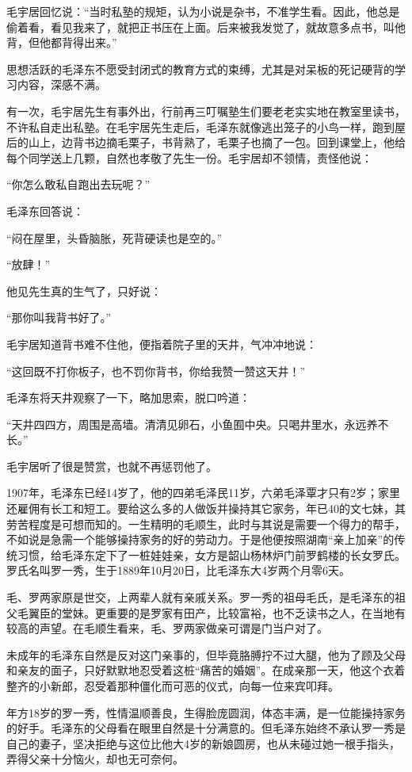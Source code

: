 \documentclass[../../dazhuan.tex]{subfiles}
\begin{document}
毛宇居回忆说：“当时私塾的规矩，认为小说是杂书，不准学生看。因此，他总是偷着看，看见我来了，就把正书压在上面。后来被我发觉了，就故意多点书，叫他背，但他都背得出来。”

思想活跃的毛泽东不愿受封闭式的教育方式的束缚，尤其是对呆板的死记硬背的学习内容，深感不满。

有一次，毛宇居先生有事外出，行前再三叮嘱塾生们要老老实实地在教室里读书，不许私自走出私塾。在毛宇居先生走后，毛泽东就像逃出笼子的小鸟一样，跑到屋后的山上，边背书边摘毛栗子，书背熟了，毛栗子也摘了一包。回到课堂上，他给每个同学送上几颗，自然也孝敬了先生一份。毛宇居却不领情，责怪他说：

“你怎么敢私自跑出去玩呢？”

毛泽东回答说：

“闷在屋里，头昏脑胀，死背硬读也是空的。”

“放肆！”

他见先生真的生气了，只好说：

“那你叫我背书好了。”

毛宇居知道背书难不住他，便指着院子里的天井，气冲冲地说：

“这回既不打你板子，也不罚你背书，你给我赞一赞这天井！”

毛泽东将天井观察了一下，略加思索，脱口吟道：

“天井四四方，周围是高墙。清清见卵石，小鱼囿中央。只喝井里水，永远养不长。”

毛宇居听了很是赞赏，也就不再惩罚他了。

1907年，毛泽东已经14岁了，他的四弟毛泽民11岁，六弟毛泽覃才只有2岁；家里还雇佣有长工和短工。要给这么多的人做饭并操持其它家务，年已40的文七妹，其劳苦程度是可想而知的。一生精明的毛顺生，此时与其说是需要一个得力的帮手，不如说是急需一个能够操持家务的好的劳动力。于是他便按照湖南“亲上加亲”的传统习惯，给毛泽东定下了一桩娃娃亲，女方是韶山杨林炉门前罗鹤楼的长女罗氏。罗氏名叫罗一秀，生于1889年10月20日，比毛泽东大4岁两个月零6天。

毛、罗两家原是世交，上两辈人就有亲戚关系。罗一秀的祖母毛氏，是毛泽东的祖父毛翼臣的堂妹。更重要的是罗家有田产，比较富裕，也不乏读书之人，在当地有较高的声望。在毛顺生看来，毛、罗两家做亲可谓是门当户对了。

未成年的毛泽东自然是反对这门亲事的，但毕竟胳膊拧不过大腿，他为了顾及父母和亲友的面子，只好默默地忍受着这桩“痛苦的婚姻”。在成亲那一天，他这个衣着整齐的小新郎，忍受着那种僵化而可恶的仪式，向每一位来宾叩拜。

年方18岁的罗一秀，性情温顺善良，生得脸庞圆润，体态丰满，是一位能操持家务的好手。毛泽东的父母看在眼里自然是十分满意的。但毛泽东始终不承认罗一秀是自己的妻子，坚决拒绝与这位比他大4岁的新娘圆房，也从未碰过她一根手指头，弄得父亲十分恼火，却也无可奈何。
\end{document}
